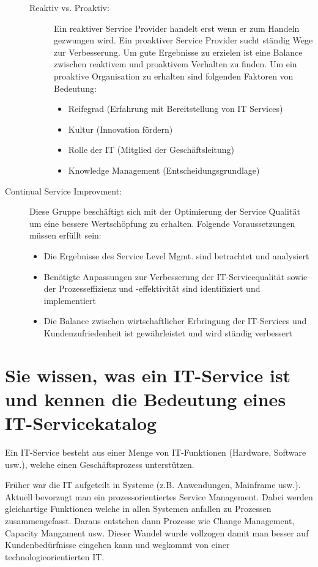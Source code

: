 \begin{description}
\begin{description}
		\item[Reaktiv vs. Proaktiv:] Ein reaktiver Service Provider handelt erst wenn er zum Handeln gezwungen wird. Ein proaktiver Service Provider sucht ständig Wege zur Verbesserung. Um gute Ergebnisse zu erzielen ist eine Balance zwischen reaktivem und proaktivem Verhalten zu finden. Um ein proaktive Organisation zu erhalten sind folgenden Faktoren von Bedeutung:
		\begin{itemize}
			\item Reifegrad (Erfahrung mit Bereitstellung von IT Services)
			\item Kultur (Innovation fördern)
			\item Rolle der IT (Mitglied der Geschäftsleitung)
			\item Knowledge Management (Entscheidungsgrundlage)
		\end{itemize}
	\end{description}
	\item[Continual Service Improvment:] Diese Gruppe beschäftigt sich mit der Optimierung der Service Qualität um eine bessere Wertschöpfung zu erhalten. Folgende Voraussetzungen müssen erfüllt sein:
	\begin{itemize}
		\item Die Ergebnisse des Service Level Mgmt. sind betrachtet und analysiert
		\item Benötigte Anpassungen zur Verbesserung der IT-Servicequalität sowie der Prozesseffizienz und -effektivität sind identifiziert und implementiert
		\item Die Balance zwischen wirtschaftlicher Erbringung der IT-Services und Kundenzufriedenheit ist gewährleistet und wird ständig verbessert
	\end{itemize}
\end{description}

\section{Sie wissen, was ein IT-Service ist und kennen die Bedeutung eines IT-Servicekatalog}

Ein IT-Service besteht aus einer Menge von IT-Funktionen (Hardware, Software usw.), welche einen Geschäftsprozess unterstützen. 

Früher war die IT aufgeteilt in Systeme (z.B. Anwendungen, Mainframe usw.). Aktuell bevorzugt man ein prozessorientiertes Service Management. Dabei werden gleichartige Funktionen welche in allen Systemen anfallen zu Prozessen zusammengefasst. Daraus entstehen dann Prozesse wie Change Management, Capacity Mangament usw. Dieser Wandel wurde vollzogen damit man besser auf Kundenbedürfnisse eingehen kann und wegkommt von einer technologieorientierten IT.

